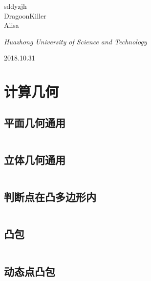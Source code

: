 \documentclass[UTF8]{ctexart}
\begin{document}
\begin{titlepage}
	{\protect sddyzjh \\ DragoonKiller \\ Alisa \\} %

	\vspace{0.5\baselineskip} %

	\textit{Huazhong University of Science and Technology} %

	\vfill %


\date{\today}

	2018.10.31 %
\end{titlepage}
\setcounter{secnumdepth}{0}

\tableofcontents

\newpage
{}

\section{计算几何}

\subsection{平面几何通用}
\inputminted{cpp}{calcgeometry/平面几何通用.cpp}

\subsection{立体几何通用}
\inputminted{cpp}{calcgeometry/立体几何通用.cpp}

\subsection{判断点在凸多边形内}
\inputminted{cpp}{calcgeometry/判断点在凸多边形内.cpp}

\subsection{凸包}
\inputminted{cpp}{calcgeometry/凸包.cpp}

\subsection{动态点凸包}
\inputminted{cpp}{calcgeometry/动态点凸包.cpp}
\end{document}
